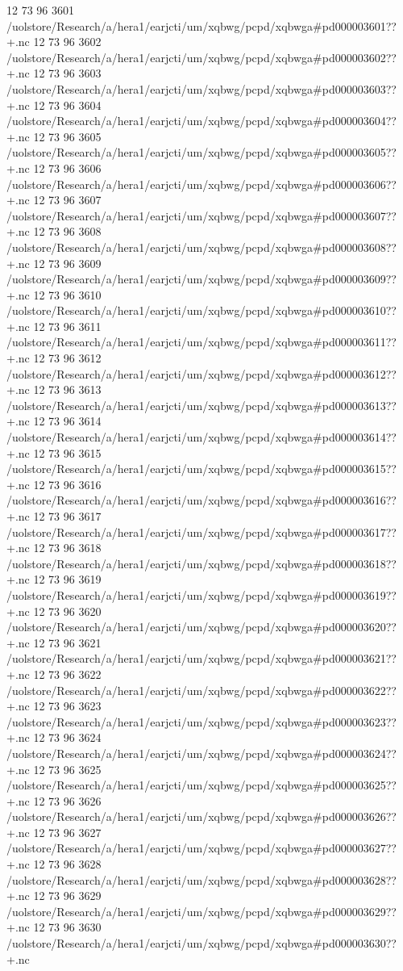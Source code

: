 12 73 96
3601
/uolstore/Research/a/hera1/earjcti/um/xqbwg/pcpd/xqbwga#pd000003601??+.nc
12 73 96
3602
/uolstore/Research/a/hera1/earjcti/um/xqbwg/pcpd/xqbwga#pd000003602??+.nc
12 73 96
3603
/uolstore/Research/a/hera1/earjcti/um/xqbwg/pcpd/xqbwga#pd000003603??+.nc
12 73 96
3604
/uolstore/Research/a/hera1/earjcti/um/xqbwg/pcpd/xqbwga#pd000003604??+.nc
12 73 96
3605
/uolstore/Research/a/hera1/earjcti/um/xqbwg/pcpd/xqbwga#pd000003605??+.nc
12 73 96
3606
/uolstore/Research/a/hera1/earjcti/um/xqbwg/pcpd/xqbwga#pd000003606??+.nc
12 73 96
3607
/uolstore/Research/a/hera1/earjcti/um/xqbwg/pcpd/xqbwga#pd000003607??+.nc
12 73 96
3608
/uolstore/Research/a/hera1/earjcti/um/xqbwg/pcpd/xqbwga#pd000003608??+.nc
12 73 96
3609
/uolstore/Research/a/hera1/earjcti/um/xqbwg/pcpd/xqbwga#pd000003609??+.nc
12 73 96
3610
/uolstore/Research/a/hera1/earjcti/um/xqbwg/pcpd/xqbwga#pd000003610??+.nc
12 73 96
3611
/uolstore/Research/a/hera1/earjcti/um/xqbwg/pcpd/xqbwga#pd000003611??+.nc
12 73 96
3612
/uolstore/Research/a/hera1/earjcti/um/xqbwg/pcpd/xqbwga#pd000003612??+.nc
12 73 96
3613
/uolstore/Research/a/hera1/earjcti/um/xqbwg/pcpd/xqbwga#pd000003613??+.nc
12 73 96
3614
/uolstore/Research/a/hera1/earjcti/um/xqbwg/pcpd/xqbwga#pd000003614??+.nc
12 73 96
3615
/uolstore/Research/a/hera1/earjcti/um/xqbwg/pcpd/xqbwga#pd000003615??+.nc
12 73 96
3616
/uolstore/Research/a/hera1/earjcti/um/xqbwg/pcpd/xqbwga#pd000003616??+.nc
12 73 96
3617
/uolstore/Research/a/hera1/earjcti/um/xqbwg/pcpd/xqbwga#pd000003617??+.nc
12 73 96
3618
/uolstore/Research/a/hera1/earjcti/um/xqbwg/pcpd/xqbwga#pd000003618??+.nc
12 73 96
3619
/uolstore/Research/a/hera1/earjcti/um/xqbwg/pcpd/xqbwga#pd000003619??+.nc
12 73 96
3620
/uolstore/Research/a/hera1/earjcti/um/xqbwg/pcpd/xqbwga#pd000003620??+.nc
12 73 96
3621
/uolstore/Research/a/hera1/earjcti/um/xqbwg/pcpd/xqbwga#pd000003621??+.nc
12 73 96
3622
/uolstore/Research/a/hera1/earjcti/um/xqbwg/pcpd/xqbwga#pd000003622??+.nc
12 73 96
3623
/uolstore/Research/a/hera1/earjcti/um/xqbwg/pcpd/xqbwga#pd000003623??+.nc
12 73 96
3624
/uolstore/Research/a/hera1/earjcti/um/xqbwg/pcpd/xqbwga#pd000003624??+.nc
12 73 96
3625
/uolstore/Research/a/hera1/earjcti/um/xqbwg/pcpd/xqbwga#pd000003625??+.nc
12 73 96
3626
/uolstore/Research/a/hera1/earjcti/um/xqbwg/pcpd/xqbwga#pd000003626??+.nc
12 73 96
3627
/uolstore/Research/a/hera1/earjcti/um/xqbwg/pcpd/xqbwga#pd000003627??+.nc
12 73 96
3628
/uolstore/Research/a/hera1/earjcti/um/xqbwg/pcpd/xqbwga#pd000003628??+.nc
12 73 96
3629
/uolstore/Research/a/hera1/earjcti/um/xqbwg/pcpd/xqbwga#pd000003629??+.nc
12 73 96
3630
/uolstore/Research/a/hera1/earjcti/um/xqbwg/pcpd/xqbwga#pd000003630??+.nc
